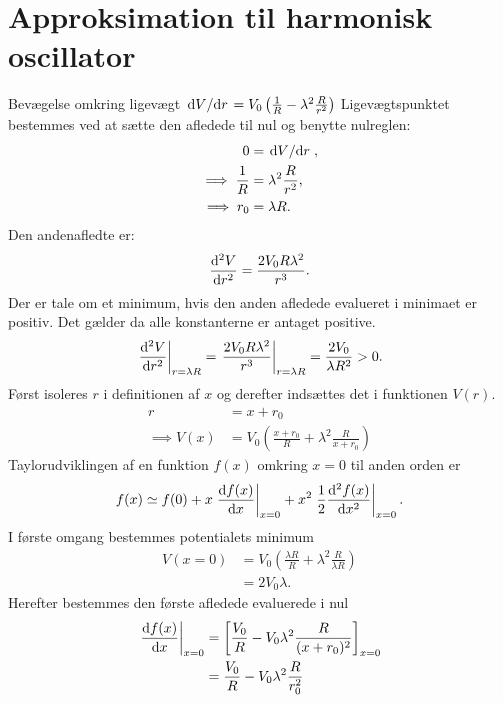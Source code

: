 \documentclass[crop=false, class=memoir]{standalone}
\begin{document}
\section*{Approksimation til harmonisk oscillator}
\begin{opgave}[2]{Bevægelse omkring ligevægt}
%
\opg $\dv*{V}{r} = V_0\left(\frac{1}{R} - \lambda^2\frac{R}{r^2}\right)$
%
\opg Ligevægtspunktet bestemmes ved at sætte den afledede til nul og benytte nulreglen:
%
\begin{align*}
	0 &= \dv*{V}{r}, \\
	\implies \frac{1}{R} &= \lambda^2\frac{R}{r^2}, \\
	\implies r_0 &= \lambda R.
\end{align*}
%
\opg Den andenafledte er:
%
\begin{align*}
	\dv[2]{V}{r} = \frac{2V_0R\lambda^2}{r^3}.
\end{align*}
%
\opg Der er tale om et minimum, hvis den anden afledede evalueret i minimaet er positiv. Det gælder da alle konstanterne er antaget positive.
%
\begin{align*}
	\left.\dv[2]{V}{r}\right|_{r = \lambda R} = \left.\frac{2V_0R\lambda^2}{r^3}\right|_{r = \lambda R} = \frac{2V_0}{\lambda R^2} > 0.
\end{align*}
%
\opg Først isoleres $r$ i definitionen af $x$ og derefter indsættes det i funktionen $V(r)$.
%
\begin{align*}
	r &= x + r_0 \\
	\implies V(x) &= V_0\left(\frac{x + r_0}{R} + \lambda^2\frac{R}{x + r_0}\right)
\end{align*}
%
\opg Taylorudviklingen af en funktion $f(x)$ omkring $x=0$ til anden orden er
%
\begin{align*}
	f(x) \simeq f(0) + x\left.\dv{f(x)}{x}\right|_{x=0} + x^2\left.\frac{1}{2}\dv[2]{f(x)}{x}\right|_{x=0}.
\end{align*}
%
I første omgang bestemmes potentialets minimum
%
\begin{align*}
	V(x=0) &= V_0\left(\frac{\lambda R}{R} + \lambda^2\frac{R}{\lambda R}\right) \\
	&= 2V_0\lambda.
\end{align*}
%
Herefter bestemmes den første afledede evaluerede i nul
%
\begin{align*}
	 \left.\dv{f(x)}{x}\right|_{x=0} &= \left[\frac{V_0}{R} - V_0\lambda^2\frac{R}{(x+r_0)^2}\right]_{x=0} \\
	 &= \frac{V_0}{R} - V_0\lambda^2\frac{R}{r_0^2} \\

\end{align*}
\end{opgave}
\end{document}
